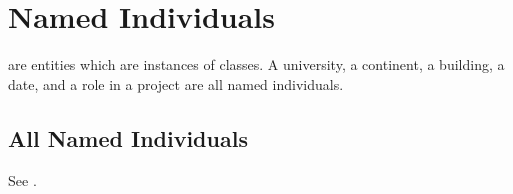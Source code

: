 \documentclass[letterpaper,10pt,english]{sphinxmanual}
\begin{document}
\begin{sphinxShadowBox}

\sphinxAtStartPar
{}
\end{sphinxShadowBox}

\begin{sphinxShadowBox}

\sphinxAtStartPar
{}
\end{sphinxShadowBox}

\begin{sphinxShadowBox}

\sphinxAtStartPar
{}
\end{sphinxShadowBox}


\chapter{Named Individuals}
\label{\detokenize{named-individuals:named-individuals}}\label{\detokenize{named-individuals::doc}}
\sphinxAtStartPar
{} are entities which are instances of classes.  A university, a
continent, a building, a date, and a role in a project are all named individuals.


\section{All Named Individuals}
\label{\detokenize{named-individuals:all-named-individuals}}
\sphinxAtStartPar
See {\hyperref[\detokenize{named-individuals:table-9}]{}}.
\end{document}
